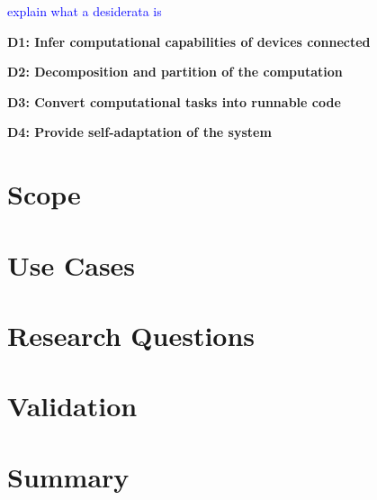 \textcolor{blue}{explain what a desiderata is}

\noindent
\textbf{D1: Infer computational capabilities of devices connected}

\noindent
\textbf{D2: Decomposition and partition of the computation}

\noindent
\textbf{D3: Convert computational tasks into runnable code}

\noindent
\textbf{D4: Provide self-adaptation of the system}

\section{Scope}\label{sec:scope}

\section{Use Cases}\label{sec:use_cases}

\section{Research Questions}\label{sec:stat_research_questions}

\section{Validation}\label{sec:stat_validation}

\section{Summary}\label{sec:stat_summary}
